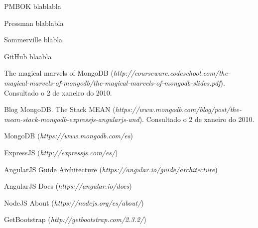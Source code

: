 

\begin{thebibliography}{99}
%
%
%

 PMBOK blablabla

 Pressman blablabla

 Sommerville blabla

 GitHub  blaabla

 The magical marvels of MongoDB ({\it http://courseware.codeschool.com/the-magical-marvels-of-mongodb/the-magical-marvels-of-mongodb-slides.pdf}). Consultado o 2 de xaneiro do 2010.

 Blog MongoDB. The Stack MEAN ({\it https://www.mongodb.com/blog/post/the-mean-stack-mongodb-expressjs-angularjs-and}). Consultado o 2 de xaneiro do 2010.

 MongoDB ({\it https://www.mongodb.com/es})

 ExpressJS ({\it http://expressjs.com/es/})

 AngularJS Guide Architecture ({\it https://angular.io/guide/architecture})

 AngularJS Docs ({\it https://angular.io/docs})

 NodeJS About ({\it https://nodejs.org/es/about/})

 GetBootstrap ({\it http://getbootstrap.com/2.3.2/})


\end{thebibliography}
